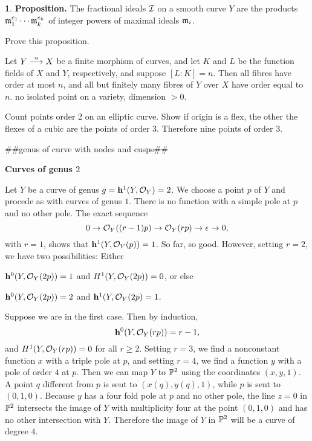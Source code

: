 \documentclass[leqno]{book}
\newcommand\Marginnote[1]{\marginnote{\hspace{-12pt}\normalfont{#1}}}
\theoremstyle{definition}%
\numberwithin{equation}{section}
\theoremstyle{theorem} %
\newtheorem{proposition}[equation]{}
\begin{document}
\begin{proposition}{\bf Proposition.} 
\Marginnote{idealincurve}\label{idealincurve} The fractional ideals
$\ci$ on a smooth curve $Y$ are the products
$\mathfrak m_1^{e_1}\cdots\mathfrak m_k^{e_k}$ of integer powers of maximal ideals
$\mathfrak m_i$.
\end{proposition}

\bs
Prove this proposition.

 Let $Y \stackrel u {\longrightarrow} X$ be
a finite morphism of curves, and let $K$ and $L$ be the function
fields of $X$ and $Y$, respectively, and suppose $[L:K]=n$.  Then all
fibres have order at most $n$, and all but finitely many fibres of $Y$
over $X$ have order equal to $n$.\bs
no isolated point on a variety, dimension $>0$.

\bs

Count points order 2 on an elliptic curve.  Show if origin is a flex,
the other the flexes of a cubic are the points of order $3$. Therefore
nine points of order $3$.

\bs

\#\#genus of curve with nodes and cusps\#\#

\bs\bsno
{\bf Curves of genus $2$}

\bsno Let $Y$ be a curve of genus $g = \hh^1(Y,\co_Y) = 2$.  We
choose a point $p$ of $Y$ and procede as with curves of genus $1$.
There is no function with a simple pole at $p$ and no other pole.  The
exact sequence
$$0 \ar \co_Y((r-1)p) \ar \co_Y(rp) \ar \epsilon \ar 0,$$
with $r=1$, shows that $\hh^1(Y,\co_Y(p)) = 1$.  So far, so good.
However, setting $r=2$, we have two possibilities:  
Either 


\msno
\sbull $\hh^0(Y,\co_Y(2p)) = 1$ and $H^1(Y,\co_Y(2p)) = 0$, or else 

\msno
\sbull $\hh^0(Y,\co_Y(2p))=2$ and $\hh^1(Y,\co_Y(2p)=1$.

\msno
Suppose we are in the first case.  Then by induction, 
$$\hh^0(Y,\co_Y(rp)) = r-1,$$ 
and $H^1(Y,\co_Y(rp))=0$ for all $r \geq 2$.  Setting $r=3$, we find a
nonconstant function $x$ with a triple pole at $p$, and setting $r=4$,
we find a function $y$ with a pole of order $4$ at $p$.  Then we can
map $Y$ to $\mathbb{P}^2$ using the coordinates $(x,y,1)$.  A point $q$
different from $p$ is sent to $(x(q),y(q),1)$, while $p$ is sent to
$(0,1,0)$.  Because $y$ has a four fold pole at $p$ and no other pole,
the line $z=0$ in $\mathbb{P}^2$ intersects the image of $Y$ with
multiplicity four at the point $(0,1,0)$ and has no other intersection
with $Y$.  Therefore the image of $Y$ in $\mathbb{P}^2$ will be a curve of
degree $4$.
\end{document}
